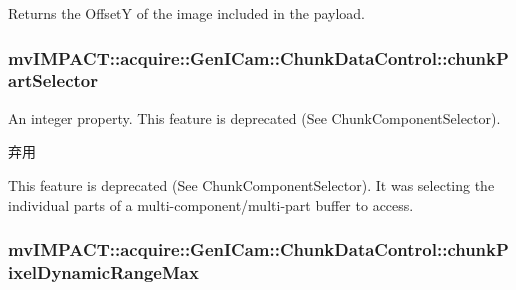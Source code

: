 Returns the Offset\+Y of the image included in the payload. \hypertarget{classmv_i_m_p_a_c_t_1_1acquire_1_1_gen_i_cam_1_1_chunk_data_control_af192e7c6c38acc638f7bdfc18bb7f96e}{
\subsubsection[{chunk\+Part\+Selector}]{ mv\+I\+M\+P\+A\+C\+T\+::acquire\+::\+Gen\+I\+Cam\+::\+Chunk\+Data\+Control\+::chunk\+Part\+Selector}}\label{classmv_i_m_p_a_c_t_1_1acquire_1_1_gen_i_cam_1_1_chunk_data_control_af192e7c6c38acc638f7bdfc18bb7f96e}


An integer property. This feature is deprecated (See Chunk\+Component\+Selector). 

\begin{DoxyRefDesc}{弃用}
\item[\hyperlink{deprecated__deprecated000056}{弃用}]This feature is deprecated (See Chunk\+Component\+Selector). It was selecting the individual parts of a multi-\/component/multi-\/part buffer to access. \end{DoxyRefDesc}
\hypertarget{classmv_i_m_p_a_c_t_1_1acquire_1_1_gen_i_cam_1_1_chunk_data_control_a64e63b9d3a7ec7e2a8011df6e4893f48}{
\subsubsection[{chunk\+Pixel\+Dynamic\+Range\+Max}]{ mv\+I\+M\+P\+A\+C\+T\+::acquire\+::\+Gen\+I\+Cam\+::\+Chunk\+Data\+Control\+::chunk\+Pixel\+Dynamic\+Range\+Max}}\label{classmv_i_m_p_a_c_t_1_1acquire_1_1_gen_i_cam_1_1_chunk_data_control_a64e63b9d3a7ec7e2a8011df6e4893f48}


